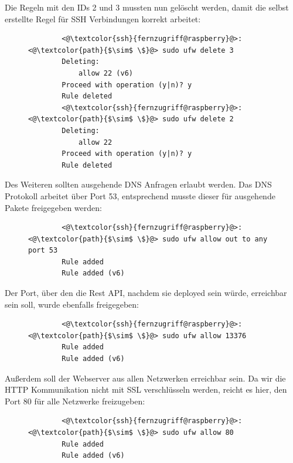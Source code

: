 \documentclass[a4paper, 12pt]{scrartcl}
\begin{document}
Die Regeln mit den IDs 2 und 3 mussten nun gelöscht werden, damit die selbst erstellte Regel für SSH Verbindungen korrekt arbeitet:
\begin{figure}[H]
    \begin{mdframed}[backgroundcolor=bbg]
        \begin{lstlisting}
        <@\textcolor{ssh}{fernzugriff@raspberry}@>:<@\textcolor{path}{$\sim$ \$}@> sudo ufw delete 3
        Deleting:
            allow 22 (v6)
        Proceed with operation (y|n)? y
        Rule deleted
        <@\textcolor{ssh}{fernzugriff@raspberry}@>:<@\textcolor{path}{$\sim$ \$}@> sudo ufw delete 2
        Deleting:
            allow 22
        Proceed with operation (y|n)? y
        Rule deleted
        \end{lstlisting}
    \end{mdframed}
    \label{lst:firewall_delete_standard}
\end{figure}
Des Weiteren sollten ausgehende DNS Anfragen erlaubt werden. Das DNS Protokoll arbeitet über Port 53, entsprechend musste dieser für ausgehende
Pakete freigegeben werden:
\begin{figure}[H]
    \begin{mdframed}[backgroundcolor=bbg]
        \begin{lstlisting}
        <@\textcolor{ssh}{fernzugriff@raspberry}@>:<@\textcolor{path}{$\sim$ \$}@> sudo ufw allow out to any port 53
        Rule added
        Rule added (v6)
        \end{lstlisting}
    \end{mdframed}
    \label{lst:firewall_allout_out_dns}
\end{figure}
Der Port, über den die Rest API, nachdem sie deployed sein würde, erreichbar sein soll, wurde ebenfalls freigegeben:
\begin{figure}[H]
    \begin{mdframed}[backgroundcolor=bbg]
        \begin{lstlisting}
        <@\textcolor{ssh}{fernzugriff@raspberry}@>:<@\textcolor{path}{$\sim$ \$}@> sudo ufw allow 13376
        Rule added
        Rule added (v6)
        \end{lstlisting}
    \end{mdframed}
    \label{lst:firewall_allow_api}
\end{figure}
Außerdem soll der Webserver aus allen Netzwerken erreichbar sein. Da wir die HTTP Kommunikation nicht mit SSL verschlüsseln werden, reicht es hier, den Port 80
für alle Netzwerke freizugeben:
\begin{figure}[H]
    \begin{mdframed}[backgroundcolor=bbg]
        \begin{lstlisting}
        <@\textcolor{ssh}{fernzugriff@raspberry}@>:<@\textcolor{path}{$\sim$ \$}@> sudo ufw allow 80
        Rule added
        Rule added (v6)
        \end{lstlisting}
    \end{mdframed}
    \label{lst:firewall_allow_http}
\end{figure}
\end{document}
